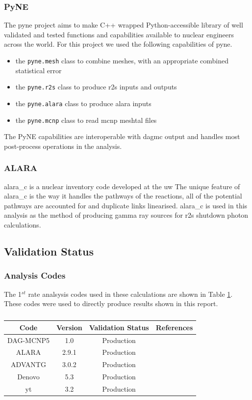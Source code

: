 \documentclass[12pt]{article}
\begin{document}
\subsubsection{PyNE}
The \gls{pyne} \cite{Scopatz2012b} project aims to
make C++ wrapped Python-accessible library of well validated and tested
functions and capabilities available to nuclear engineers across the world.
For this project we used the following capabilities of \gls{pyne}.
\begin{itemize}
  \item{the \texttt{pyne.mesh} class to combine meshes, with an appropriate
        combined statistical error}
  \item{the \texttt{pyne.r2s} class to produce \gls{r2s} inputs and outputs}
  \item{the \texttt{pyne.alara} class to produce alara inputs}
  \item{the \texttt{pyne.mcnp} class to read \gls{mcnp} meshtal files}
\end{itemize}
The PyNE capabilities are interoperable with \gls{dagmc} output and handles
most post-process operations in the analysis.
\subsubsection{ALARA}
\gls{alara_c} \cite{alara} is a nuclear inventory code developed at the \gls{uw}
The unique feature of \gls{alara_c} is the way it handles the
pathways of the reactions, all of the potential pathways are accounted for and
duplicate links linearised. \gls{alara_c} is used in this analysis as the method
of producing gamma ray sources for \gls{r2s} shutdown photon calculations.
\subsection{Validation Status}
\subsubsection*{Analysis Codes}
The 1$^{st}$ rate analsysis codes used in these calculations are shown in Table 
\ref{table:validation}. These codes were used to directly produce results shown
in this report.
\begin{centering}
 \begin{table}[ht!]
  \begin{tabular}{c | c | c | c}
  \hline
  Code & Version & Validation Status & References \\
  \hline 
  DAG-MCNP5 & 1.0 & Production & \cite{dagmc_validation}\\
  ALARA & 2.9.1 & Production & \cite{alara}\\
  ADVANTG & 3.0.2 & Production & \cite{advantg}\\
  Denovo & 5.3 & Production & \cite{denovo} \\
  yt & 3.2 & Production & \\
  \end{tabular}
 \caption{}
 \label{table:validation}
 \end{table}
\end{centering}
\end{document}
